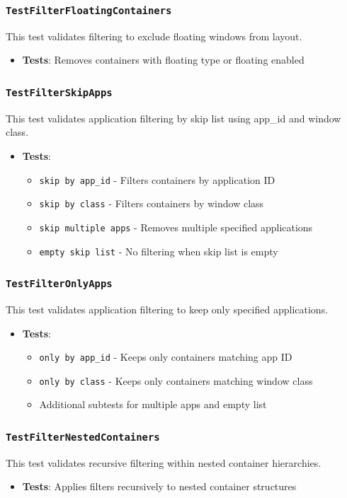 \subsubsection*{\texttt{TestFilterFloatingContainers}}
This test validates filtering to exclude floating windows from layout.
\begin{itemize}
    \item \textbf{Tests}: Removes containers with floating type or floating enabled
\end{itemize}

\subsubsection*{\texttt{TestFilterSkipApps}}
This test validates application filtering by skip list using app\_id and window class.
\begin{itemize}
    \item \textbf{Tests}:
    \begin{itemize}
        \item \texttt{skip by app\_id} - Filters containers by application ID
        \item \texttt{skip by class} - Filters containers by window class
        \item \texttt{skip multiple apps} - Removes multiple specified applications
        \item \texttt{empty skip list} - No filtering when skip list is empty
    \end{itemize}
\end{itemize}

\subsubsection*{\texttt{TestFilterOnlyApps}}
This test validates application filtering to keep only specified applications.
\begin{itemize}
    \item \textbf{Tests}:
    \begin{itemize}
        \item \texttt{only by app\_id} - Keeps only containers matching app ID
        \item \texttt{only by class} - Keeps only containers matching window class
        \item Additional subtests for multiple apps and empty list
    \end{itemize}
\end{itemize}

\subsubsection*{\texttt{TestFilterNestedContainers}}
This test validates recursive filtering within nested container hierarchies.
\begin{itemize}
    \item \textbf{Tests}: Applies filters recursively to nested container structures
\end{itemize}

